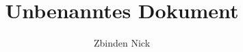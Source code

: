 \documentclass{beamer-fancy}
\title{Unbenanntes Dokument}
\author{Zbinden Nick}
\begin{document}
\thispagestyle{fancy}


\begin{frame}
  \titlepage
\end{frame}
\end{document}
